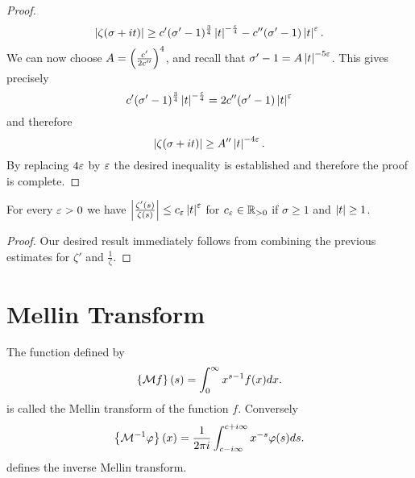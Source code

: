 \begin{proof}
\begin{equation*}
	\left|\zeta(\sigma + it)\right| \geq c'(\sigma' - 1)^{\frac{3}{4}}\left|t\right|^{-\frac{\varepsilon}{4}} - c''(\sigma' - 1)\left|t\right|^{\varepsilon}.
\end{equation*}
	We can now choose $A = \left(\frac{c'}{2 c''}\right)^4$, and recall that $\sigma' - 1 = A \left|t\right|^{-5 \varepsilon}$. This gives precisely
\begin{equation*}
	c'(\sigma' - 1)^{\frac{3}{4}} \left|t\right|^{-\frac{\varepsilon}{4}} = 2 c''(\sigma' - 1) \left|t\right|^{\varepsilon}
\end{equation*}
	and therefore
\begin{equation*}
	\left|\zeta(\sigma + it)\right| \geq A''\left|t\right|^{-4 \varepsilon}.
\end{equation*}
	By replacing $4 \varepsilon$ by $\varepsilon$ the desired inequality is established and therefore the proof is complete.
\end{proof}


\begin{corollary}\label{cor:ZetaQuotEst}
	For every $\varepsilon > 0$ we have $\left|\frac{\zeta'(s)}{\zeta(s)}\right| \leq c_\varepsilon \left|t\right|^\varepsilon$ for $c_\varepsilon \in \mathbb{R}_{> 0}$ if $\sigma \geq 1$ and $\left|t\right| \geq 1$.
\end{corollary}
\begin{proof}
	Our desired result immediately follows from combining the previous estimates for $\zeta'$ and $\frac{1}{\zeta}$.
\end{proof}


\section{Mellin Transform}


\begin{definition}
	The function defined by
\begin{equation*}
	\left\{\mathcal{M}f\right\}(s) = \int _0 ^\infty x^{s - 1} f(x) dx.
\end{equation*}
	is called the Mellin transform of the function $f$. Conversely
\begin{equation*}
	\left\{\mathcal{M}^{-1} \varphi\right\}(x) = \frac{1}{2 \pi i} \int _{c - i \infty} ^{c + i \infty} x^{-s} \varphi(s) ds.
\end{equation*}
	defines the inverse Mellin transform.
\end{definition}


